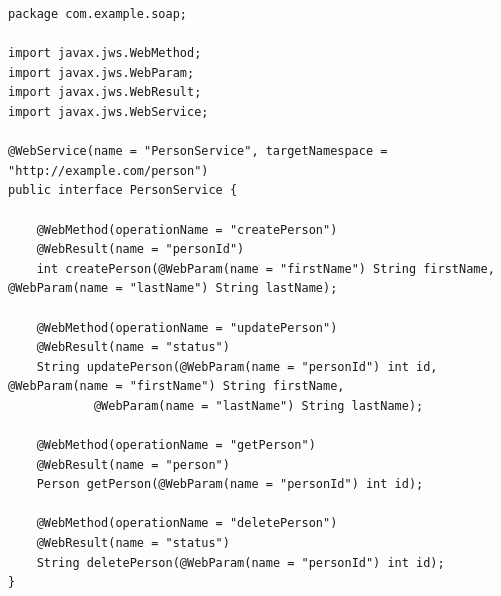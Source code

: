 \documentclass[../vs-script-first-v01.tex]{subfiles}
\begin{document}
\begin{minipage}{\textwidth}
\begin{lstlisting}[caption={SOAP Person Service Interface},captionpos=b,label={lst:soap_person_inter}]
package com.example.soap;

import javax.jws.WebMethod;
import javax.jws.WebParam;
import javax.jws.WebResult;
import javax.jws.WebService;

@WebService(name = "PersonService", targetNamespace = "http://example.com/person")
public interface PersonService {

    @WebMethod(operationName = "createPerson")
    @WebResult(name = "personId")
    int createPerson(@WebParam(name = "firstName") String firstName, @WebParam(name = "lastName") String lastName);

    @WebMethod(operationName = "updatePerson")
    @WebResult(name = "status")
    String updatePerson(@WebParam(name = "personId") int id, @WebParam(name = "firstName") String firstName,
            @WebParam(name = "lastName") String lastName);

    @WebMethod(operationName = "getPerson")
    @WebResult(name = "person")
    Person getPerson(@WebParam(name = "personId") int id);

    @WebMethod(operationName = "deletePerson")
    @WebResult(name = "status")
    String deletePerson(@WebParam(name = "personId") int id);
}
\end{lstlisting}
\end{minipage}
\end{document}

